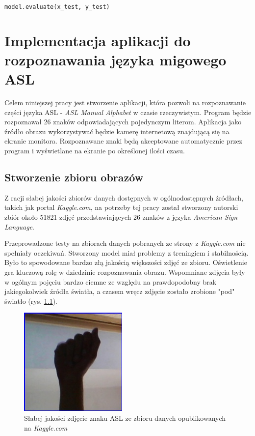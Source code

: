 \documentclass[a4paper,12pt,oneside]{book} %
\begin{document}
\begin{lstlisting}[language=Python, caption={Ewaluacja modelu \cite{mnistapp}}, label={lst:mnisteval}]
	model.evaluate(x_test, y_test)
\end{lstlisting}


\chapter{Implementacja aplikacji do rozpoznawania języka migowego ASL}

Celem niniejszej pracy jest stworzenie aplikacji, która pozwoli na rozpoznawanie części języka ASL - \emph{ASL Manual Alphabet} w czasie rzeczywistym. Program będzie rozpoznawał 26 znaków odpowiadających pojedynczym literom. Aplikacja jako źródło obrazu wykorzystywać będzie kamerę internetową znajdującą się na ekranie monitora. Rozpoznawane znaki będą akceptowane automatycznie przez program i wyświetlane na ekranie po określonej ilości czasu.

\section{Stworzenie zbioru obrazów}

Z racji słabej jakości zbiorów danych dostępnych w ogólnodostępnych źródłach, takich jak portal \emph{Kaggle.com}, na potrzeby tej pracy został stworzony autorski zbiór około 51821 zdjęć przedstawiających 26 znaków z języka \emph{American Sign Language}.

Przeprowadzone testy na zbiorach danych pobranych ze strony z \emph{Kaggle.com} \cite{asl1}\cite{asl2} nie spełniały oczekiwań. Stworzony model miał problemy z treningiem i stabilnością. Było to spowodowane bardzo złą jakością większości zdjęć ze zbioru. Oświetlenie gra kluczową rolę w dziedzinie rozpoznawania obrazu. Wspomniane zdjęcia były w ogólnym pojęciu bardzo ciemne ze względu na prawdopodobny brak jakiegokolwiek źródła światła, a czasem wręcz zdjęcie zostało zrobione "pod" światło (rys. \ref{asl_bad_photo}). 

\begin{figure}[h]
	\centering
	\includegraphics[scale=0.6]{asl_bad_photo.jpg}
	\caption{Słabej jakości zdjęcie znaku ASL ze zbioru danych opublikowanych na \emph{Kaggle.com} \cite{asl1}}
	\label{asl_bad_photo}
\end{figure}
\end{document}
